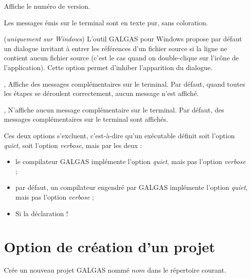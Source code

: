  Affiche le numéro de version.

 Les messages émis sur le terminal sont en texte pur, sans coloration.

 (\emph{uniquement sur Windows}) L’outil GALGAS pour Windows propose par défaut un dialogue invitant à entrer les références d’un fichier source si la ligne ne contient aucun fichier source (c’est le cas quand on double-clique sur l’icône de l’application). Cette option permet d'inhiber l’apparition du dialogue.




,  Affiche des messages complémentaires sur le terminal. Par défaut, quand toutes les étapes se déroulent correctement, aucun message n’est affiché.

,  N'affiche aucun message complémentaire sur le terminal. Par défaut, des messages complémentaires sur le terminal sont affichés.

Ces deux options s'excluent, c'est-à-dire qu'un exécutable définit soit l'option \emph{quiet}, soit l'option \emph{verbose}, mais par les deux :
\begin{itemize}
  \item le compilateur GALGAS implémente l'option \emph{quiet}, mais pas l'option \emph{verbose} ;
  \item par défaut, un compilateur engendré par GALGAS implémente l'option \emph{quiet}, mais pas l'option \emph{verbose} ;
  \item Si la déclaration \ggs!%
\end{itemize}





\section{Option de création d'un projet}


 Crée un nouveau projet GALGAS nommé $nom$ dans le répertoire courant.




